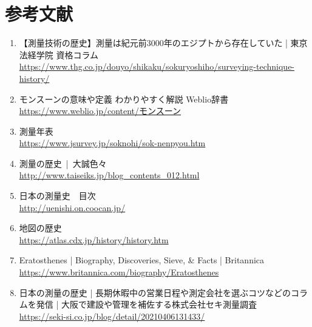 \documentclass[titlepage]{jarticle}
\begin{document}
\section*{参考文献}
\begin{enumerate}
      \item 【測量技術の歴史】測量は紀元前3000年のエジプトから存在していた | 東京法経学院 資格コラム\\
            \url{https://www.thg.co.jp/douyo/shikaku/sokuryoshiho/surveying-technique-history/}
      \item モンスーンの意味や定義 わかりやすく解説 Weblio辞書\\
            \url{https://www.weblio.jp/content/モンスーン}
      \item 測量年表\\
            \url{https://www.jsurvey.jp/soknohi/sok-nenpyou.htm}
      \item 測量の歴史 | 大誠色々\\
            \url{http://www.taiseiks.jp/blog_contents_012.html}
      \item 日本の測量史　目次\\
            \url{http://uenishi.on.coocan.jp/}
      \item 地図の歴史\\
            \url{https://atlas.cdx.jp/history/history.htm}
      \item Eratosthenes | Biography, Discoveries, Sieve, \& Facts | Britannica\\
            \url{https://www.britannica.com/biography/Eratosthenes}
      \item 日本の測量の歴史 | 長期休暇中の営業日程や測定会社を選ぶコツなどのコラムを発信 | 大阪で建設や管理を補佐する株式会社セキ測量調査\\
            \url{https://seki-si.co.jp/blog/detail/20210406131433/}
\end{enumerate}
% 
\end{document}
